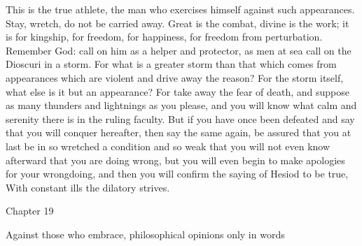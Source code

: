 \documentclass[a4paper]{article}
\begin{document}
    This is the true athlete, the man who exercises himself against such
appearances. Stay, wretch, do not be carried away. Great is the combat, divine
is the work; it is for kingship, for freedom, for happiness, for freedom from
perturbation. Remember God: call on him as a helper and protector, as men at
sea call on the Dioscuri in a storm. For what is a greater storm than that
which comes from appearances which are violent and drive away the reason? For
the storm itself, what else is it but an appearance? For take away the fear of
death, and suppose as many thunders and lightnings as you please, and you will
know what calm and serenity there is in the ruling faculty. But if you have
once been defeated and say that you will conquer hereafter, then say the same
again, be assured that you at last be in so wretched a condition and so weak
that you will not even know afterward that you are doing wrong, but you will
even begin to make apologies for your wrongdoing, and then you will confirm the
saying of Hesiod to be true,
       With constant ills the dilatory strives.

Chapter 19

Against those who embrace, philosophical opinions only in words
\end{document}
